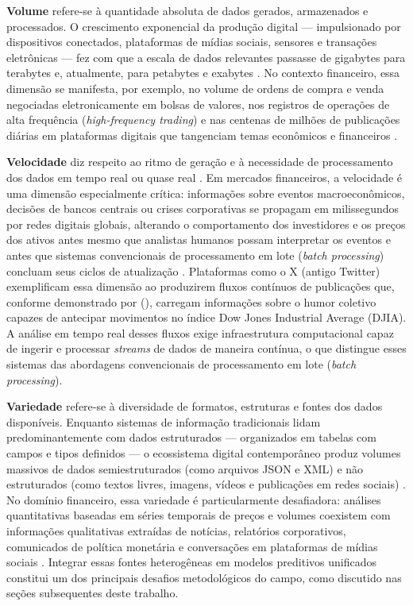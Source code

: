 \textbf{Volume} refere-se à quantidade absoluta de dados gerados, armazenados e processados. O crescimento exponencial da produção digital --- impulsionado por  dispositivos conectados, plataformas de mídias sociais, sensores e transações eletrônicas --- fez com que a escala de dados relevantes passasse de gigabytes para terabytes e, atualmente, para petabytes e exabytes \cite{mayer2013}. No contexto financeiro, essa dimensão se manifesta, por exemplo, no volume de ordens de compra e venda negociadas eletronicamente em bolsas de valores, nos registros de operações de alta frequência (\textit{high-frequency trading}) e nas centenas de milhões de publicações diárias em plataformas digitais que tangenciam temas econômicos e financeiros \cite{bollen2011,ranco2015}.

\textbf{Velocidade} diz respeito ao ritmo de geração e à necessidade de processamento dos dados em tempo real ou quase real \cite{laney2001}. Em mercados financeiros, a velocidade é uma dimensão especialmente crítica: informações sobre eventos macroeconômicos, decisões de bancos centrais ou crises corporativas se propagam em milissegundos por redes digitais globais, alterando o comportamento dos investidores e os preços dos ativos antes mesmo que analistas humanos possam interpretar os eventos e antes que sistemas convencionais de processamento em lote (\textit{batch processing}) concluam seus ciclos de atualização \cite{chen2014bigdata}. Plataformas como o X (antigo Twitter) exemplificam essa dimensão ao produzirem fluxos contínuos de publicações que, conforme demonstrado por \citeauthor{bollen2011} (\citeyear{bollen2011}), carregam informações sobre o humor coletivo capazes de antecipar movimentos no índice Dow Jones Industrial Average (DJIA). A análise em tempo real desses fluxos exige infraestrutura computacional capaz de ingerir e processar \textit{streams} de dados de maneira contínua, o que distingue esses sistemas das abordagens convencionais de processamento em lote (\textit{batch processing}).

\textbf{Variedade} refere-se à diversidade de formatos, estruturas e fontes dos dados disponíveis. Enquanto sistemas de informação tradicionais lidam predominantemente com
dados estruturados --- organizados em tabelas com campos e tipos definidos --- o ecossistema digital contemporâneo produz volumes massivos de dados semiestruturados
(como arquivos JSON e XML) e não estruturados (como textos livres, imagens, vídeos e publicações em redes sociais) \cite{laney2001,mayer2013}. No domínio financeiro, essa variedade é particularmente desafiadora: análises quantitativas baseadas em séries temporais de preços e volumes coexistem com informações qualitativas extraídas de notícias, relatórios corporativos, comunicados de política monetária e conversações em plataformas de mídias sociais \cite{kearney2014}. Integrar essas fontes heterogêneas em modelos preditivos unificados constitui um dos principais desafios metodológicos do campo, como discutido nas seções subsequentes deste trabalho.

